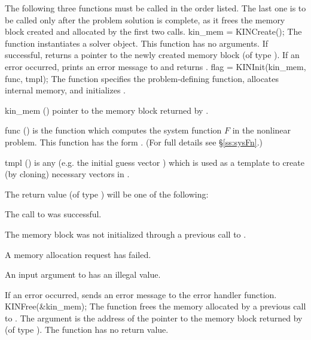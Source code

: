 The following three functions must be called in the order listed. The last one
is to be called only after the problem solution is complete, as it frees the
{\kinsol} memory block created and allocated by the first two calls.
{
  kin\_mem = KINCreate();
}
{
  The function  instantiates a {\kinsol} solver object.
}
{
  This function has no arguments.
}
{
  If successful,  returns a pointer to the newly created 
  {\kinsol} memory block (of type ).
  If an error occurred,  prints an error message to 
  and returns .
}
{}
{
flag = KINInit(kin\_mem, func, tmpl);
}
{
  The function  specifies the problem-defining
  function, allocates internal memory, and initializes {\kinsol}.
}
{
  \begin{args}
  \item[kin\_mem] ()
    pointer to the {\kinsol} memory block returned by .
  \item[func] ()
    is the {\C} function which computes the system function $F$ in the nonlinear
    problem.  This function has the form . 
    (For full details see \S\ref{ss:sysFn}.)
  \item[tmpl] ()
    is any  (e.g. the initial guess vector ) which is used
    as a template to create (by cloning) necessary vectors in .
  \end{args}
}
{
  The return value  (of type ) will be one of the following:
  \begin{args}
  \item[\Id{KIN\_SUCCESS}]
    The call to  was successful.
  \item[\Id{KIN\_MEM\_NULL}] 
    The {\kinsol} memory block was not initialized through a previous call
    to .
  \item[\Id{KIN\_MEM\_FAIL}] 
    A memory allocation request has failed.
  \item[\Id{KIN\_ILL\_INPUT}] 
    An input argument to  has an illegal value.
  \end{args}
}
{
  If an error occurred,  sends an error message to the
  error handler function.
}
{
  KINFree(\&kin\_mem);
}
{
  The function  frees the memory allocated by
  a previous call to .
}
{
  The argument is the address of the pointer to the {\kinsol} memory block
  returned by  (of type ).
}
{
  The function  has no return value.
}
{}


